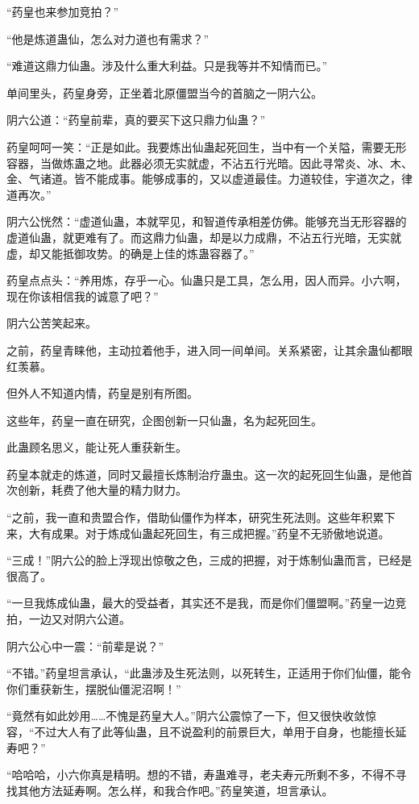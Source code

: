 \begin{this_body}
“药皇也来参加竞拍？”

“他是炼道蛊仙，怎么对力道也有需求？”

“难道这鼎力仙蛊。涉及什么重大利益。只是我等并不知情而已。”

单间里头，药皇身旁，正坐着北原僵盟当今的首脑之一阴六公。

阴六公道：“药皇前辈，真的要买下这只鼎力仙蛊？”

药皇呵呵一笑：“正是如此。我要炼出仙蛊起死回生，当中有一个关隘，需要无形容器，当做炼蛊之地。此器必须无实就虚，不沾五行光暗。因此寻常炎、冰、木、金、气诸道。皆不能成事。能够成事的，又以虚道最佳。力道较佳，宇道次之，律道再次。”

阴六公恍然：“虚道仙蛊，本就罕见，和智道传承相差仿佛。能够充当无形容器的虚道仙蛊，就更难有了。而这鼎力仙蛊，却是以力成鼎，不沾五行光暗，无实就虚，却又能抵御攻势。的确是上佳的炼蛊容器了。”

药皇点点头：“养用炼，存乎一心。仙蛊只是工具，怎么用，因人而异。小六啊，现在你该相信我的诚意了吧？”

阴六公苦笑起来。

之前，药皇青睐他，主动拉着他手，进入同一间单间。关系紧密，让其余蛊仙都眼红羡慕。

但外人不知道内情，药皇是别有所图。

这些年，药皇一直在研究，企图创新一只仙蛊，名为起死回生。

此蛊顾名思义，能让死人重获新生。

药皇本就走的炼道，同时又最擅长炼制治疗蛊虫。这一次的起死回生仙蛊，是他首次创新，耗费了他大量的精力财力。

“之前，我一直和贵盟合作，借助仙僵作为样本，研究生死法则。这些年积累下来，大有成果。对于炼成仙蛊起死回生，有三成把握。”药皇不无骄傲地说道。

“三成！”阴六公的脸上浮现出惊敬之色，三成的把握，对于炼制仙蛊而言，已经是很高了。

“一旦我炼成仙蛊，最大的受益者，其实还不是我，而是你们僵盟啊。”药皇一边竞拍，一边又对阴六公道。

阴六公心中一震：“前辈是说？”

“不错。”药皇坦言承认，“此蛊涉及生死法则，以死转生，正适用于你们仙僵，能令你们重获新生，摆脱仙僵泥沼啊！”

“竟然有如此妙用……不愧是药皇大人。”阴六公震惊了一下，但又很快收敛惊容，“不过大人有了此等仙蛊，且不说盈利的前景巨大，单用于自身，也能擅长延寿吧？”

“哈哈哈，小六你真是精明。想的不错，寿蛊难寻，老夫寿元所剩不多，不得不寻找其他方法延寿啊。怎么样，和我合作吧。”药皇笑道，坦言承认。


\end{this_body}
